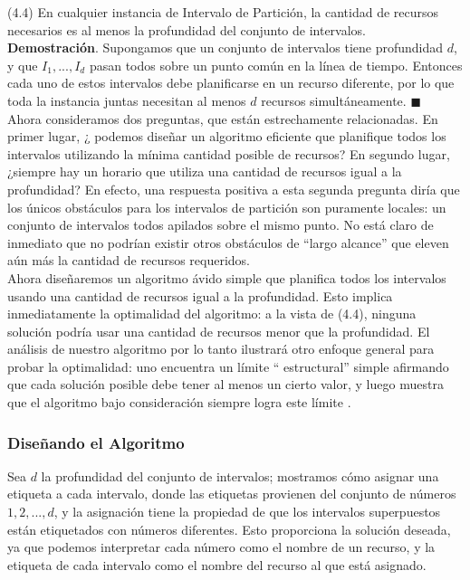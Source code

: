 \documentclass[a4paper, 12pt]{book}
\theoremstyle{dotless}
\begin{document}
(4.4) En cualquier instancia de Intervalo de Partición, la cantidad de recursos necesarios es al menos la profundidad del conjunto de intervalos.\\

\textbf{Demostración}. Supongamos que un conjunto de intervalos tiene profundidad $d$, y que $I_1, ..., I_d$ pasan todos sobre un punto común en la línea de tiempo. Entonces cada uno de estos intervalos debe planificarse en un recurso diferente, por lo que toda la instancia juntas necesitan al menos $d$ recursos simultáneamente.  $\blacksquare$\\

Ahora consideramos dos preguntas, que están estrechamente relacionadas. En primer lugar, ¿ podemos diseñar un algoritmo eficiente que planifique todos los intervalos utilizando la mínima cantidad posible de recursos? En segundo lugar, ¿siempre hay un horario que utiliza una cantidad de recursos igual a la profundidad? En efecto, una respuesta positiva a esta segunda pregunta diría que los únicos obstáculos para los intervalos de partición son puramente locales: un conjunto de intervalos todos apilados sobre el mismo punto. No está claro de inmediato que no podrían existir otros obstáculos de ``largo alcance'' que eleven aún más la cantidad de recursos requeridos.\\

Ahora diseñaremos un algoritmo ávido simple que planifica todos los intervalos usando una cantidad de recursos igual a la profundidad. Esto implica inmediatamente la optimalidad del algoritmo: a la vista de (4.4), ninguna solución podría usar una cantidad de recursos menor que la profundidad. El análisis de nuestro algoritmo por lo tanto ilustrará otro enfoque general para probar la optimalidad: uno encuentra un límite `` estructural'' simple afirmando que cada solución posible debe tener al menos un cierto valor, y luego muestra que el algoritmo bajo consideración siempre logra este límite .\\

\subsubsection*{Diseñando el Algoritmo} Sea $d$ la profundidad del conjunto de intervalos; mostramos cómo asignar una etiqueta a cada intervalo, donde las etiquetas provienen del conjunto de números ${1,2,...,d}$, y la asignación tiene la propiedad de que los intervalos superpuestos están etiquetados con números diferentes. Esto proporciona la solución deseada, ya que podemos interpretar cada número como el nombre de un recurso, y la etiqueta de cada intervalo como el nombre del recurso al que está asignado.\\
\end{document}
